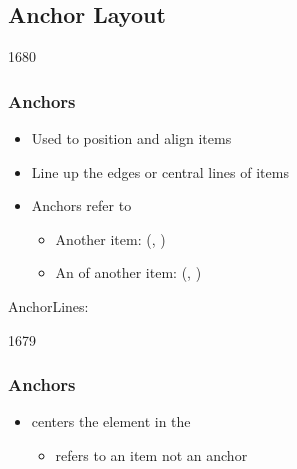 %
%
%
%

\subsection{Anchor Layout}


\begin{slide}{1680}\frametitle{Anchors}

\begin{itemize}
\item Used to position and align items
\item Line up the edges or central lines of items
\item Anchors refer to
\begin{itemize}
\item Another item: (, )
\item An  of another item: (, )
\end{itemize}
\end{itemize}
\begin{flushright}
AnchorLines: \hspace{1in} \\
\end{flushright}
\end{slide}


\begin{slide}{1679}\frametitle{Anchors}


\begin{itemize}
\item {} centers the 
element in the 
  \begin{itemize}
  \item refers to an item not an anchor
  \end{itemize}
\end{itemize}                              
\end{slide}

